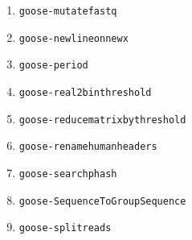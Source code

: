 \begin{enumerate}
\item \texttt{goose-mutatefastq}
\item \texttt{goose-newlineonnewx}
\item \texttt{goose-period}

\item \texttt{goose-real2binthreshold}
\item \texttt{goose-reducematrixbythreshold}
\item \texttt{goose-renamehumanheaders}

\item \texttt{goose-searchphash}

\item \texttt{goose-SequenceToGroupSequence}
\item \texttt{goose-splitreads}

\end{enumerate}



%




%
%


%
%
%
%
%
%
%
%
%
%
%
%
%
%
%
%
%
%
%